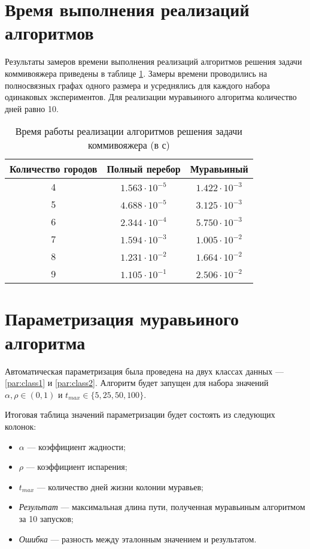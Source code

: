 \section{Время выполнения реализаций алгоритмов}

Результаты замеров времени выполнения реализаций алгоритмов решения задачи коммивояжера приведены в таблице \ref{tbl:time_measurements}.
Замеры времени проводились на полносвязных графах одного размера и усреднялись для каждого набора одинаковых экспериментов. Для реализации муравьиного алгоритма количество дней равно 10.

\begin{table}[h]
	\begin{center}
		\begin{threeparttable}
			\captionsetup{justification=raggedright,singlelinecheck=off}
			\caption{Время работы реализации алгоритмов решения задачи коммивояжера (в с)}
			\label{tbl:time_measurements}
			\begin{tabular}{|c|c|c|}
				\hline
				Количество городов &  Полный перебор  & Муравьиный \\
				\hline
				4 &$ 1.563\cdot10^{-5} $&$ 1.422\cdot10^{-3}$\\
				\hline
				5 &$ 4.688\cdot10^{-5} $&$ 3.125\cdot10^{-3}$\\
				\hline
				6 &$ 2.344\cdot10^{-4} $&$ 5.750\cdot10^{-3}$\\
				\hline
				7 &$ 1.594\cdot10^{-3} $&$ 1.005\cdot10^{-2}$\\
				\hline
				8 &$ 1.231\cdot10^{-2} $&$ 1.664\cdot10^{-2}$\\
				\hline
				9 &$ 1.105\cdot10^{-1} $&$ 2.506\cdot10^{-2}$\\
				\hline
			\end{tabular}
		\end{threeparttable}
	\end{center}
\end{table}

\section{Параметризация муравьиного алгоритма}

Автоматическая параметризация была проведена на двух классах данных --- \ref{par:class1} и \ref{par:class2}. Алгоритм будет запущен для набора значений $\alpha, \rho \in (0, 1)$ и $t_{max} \in \{5, 25, 50, 100\}$.

Итоговая таблица значений параметризации будет состоять из следующих колонок:
\begin{itemize}[label=---]
	\item $\alpha$ --- коэффициент жадности;
	\item $\rho$ --- коэффициент испарения;
	\item $t_{max}$ --- количество дней жизни колонии муравьев;
	\item \textit{Результат} --- максимальная длина пути, полученная муравьиным алгоритмом за 10 запусков;
	\item \textit{Ошибка} --- разность между эталонным значением и результатом.
\end{itemize}

